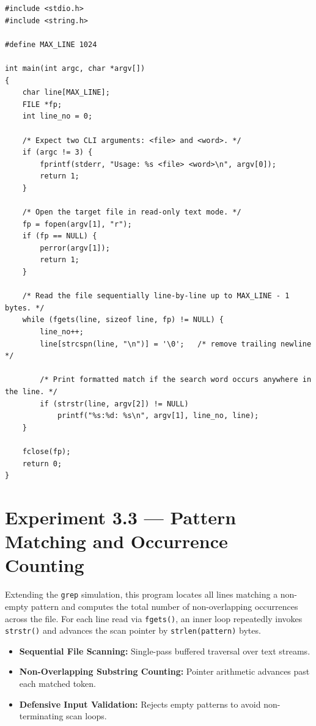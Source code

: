 \documentclass[11pt,a4paper]{article}
\newcommand{\exptheader}[3]{%
    \section[#1: #2]{#1 --- #2}%
    \label{#3}%
}
\begin{document}
\begin{lstlisting}[title={\texttt{expt\_3\_2.c}}]
#include <stdio.h>
#include <string.h>

#define MAX_LINE 1024

int main(int argc, char *argv[])
{
    char line[MAX_LINE];
    FILE *fp;
    int line_no = 0;

    /* Expect two CLI arguments: <file> and <word>. */
    if (argc != 3) {
        fprintf(stderr, "Usage: %s <file> <word>\n", argv[0]);
        return 1;
    }

    /* Open the target file in read-only text mode. */
    fp = fopen(argv[1], "r");
    if (fp == NULL) {
        perror(argv[1]);
        return 1;
    }

    /* Read the file sequentially line-by-line up to MAX_LINE - 1 bytes. */
    while (fgets(line, sizeof line, fp) != NULL) {
        line_no++;
        line[strcspn(line, "\n")] = '\0';   /* remove trailing newline */

        /* Print formatted match if the search word occurs anywhere in the line. */
        if (strstr(line, argv[2]) != NULL)
            printf("%s:%d: %s\n", argv[1], line_no, line);
    }

    fclose(fp);
    return 0;
}
\end{lstlisting}

\exptheader{Experiment 3.3}{Pattern Matching and Occurrence Counting}{exp:3.3}

Extending the \texttt{grep} simulation, this program locates all lines matching a non-empty pattern and computes the total number of non-overlapping occurrences across the file. For each line read via \texttt{fgets()}, an inner loop repeatedly invokes \texttt{strstr()} and advances the scan pointer by \texttt{strlen(pattern)} bytes.

\begin{itemize}
    \item \textbf{Sequential File Scanning:} Single-pass buffered traversal over text streams.
    \item \textbf{Non-Overlapping Substring Counting:} Pointer arithmetic advances past each matched token.
    \item \textbf{Defensive Input Validation:} Rejects empty patterns to avoid non-terminating scan loops.
\end{itemize}
\end{document}
